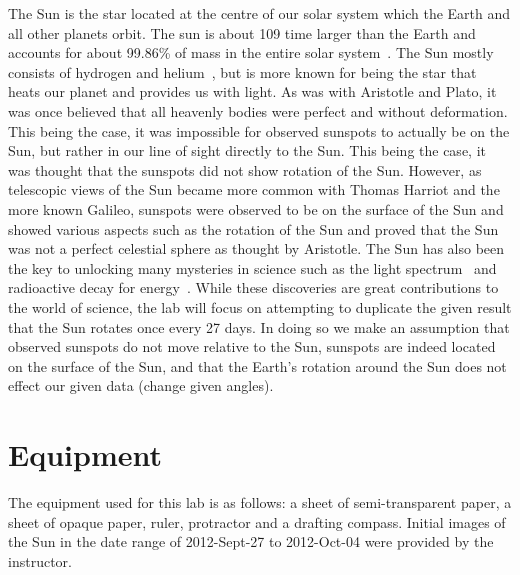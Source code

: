 \documentclass{article}
\begin{document}
The Sun is the star located at the centre of our solar system which the Earth and all other planets orbit. The sun is about 109 time larger 
than the Earth and accounts for about 99.86\% of mass in the entire solar system~\cite{Wolf:2000}. The Sun mostly consists of hydrogen
and helium~\cite{Basu:2008}, but is more known for being the star that heats our planet and provides us with light. As was with Aristotle
and Plato, it was once believed that all heavenly bodies were perfect and without deformation. This being the case, it was impossible
for observed sunspots to actually be on the Sun, but rather in our line of sight directly to the Sun. This being the case, it was thought
that the sunspots did not show rotation of the Sun. However, as telescopic views of the Sun became more common with Thomas Harriot
and the more known Galileo, sunspots were observed to be on the surface of the Sun and showed various aspects such as the rotation
of the Sun and proved that the Sun was not a perfect celestial sphere as thought by Aristotle. The Sun has also been the key to unlocking
many mysteries in science such as the light spectrum~\cite{BBC:2006} and radioactive decay for energy~\cite{Darden:1998}. While these
discoveries are great contributions to the world of science, the lab will focus on attempting to duplicate the given result that the Sun
rotates once every 27 days. In doing so we make an assumption that observed sunspots do not move relative to the Sun, sunspots are
indeed located on the surface of the Sun, and that the Earth's rotation around the Sun does not effect our given data (change given
angles).\\


\section{Equipment}

The equipment used for this lab is as follows: a sheet of semi-transparent paper,  a sheet of opaque paper, ruler, protractor and
 a drafting compass. Initial images of the Sun in the date range of 2012-Sept-27 to 2012-Oct-04 were provided by the instructor.\\

\end{document}
